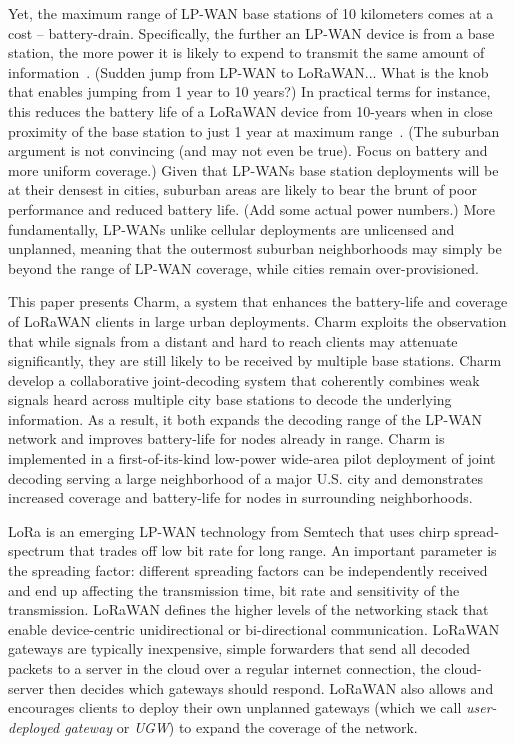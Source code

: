 Yet, the maximum range of LP-WAN base stations of 10 kilometers comes at a
cost -- battery-drain. Specifically, the further an LP-WAN device is from a
base station, the more power it is likely to expend to transmit the same
amount of information{\color{red}~\cite{}}. {\color{blue} (Sudden jump from
LP-WAN to LoRaWAN... What is the knob that enables jumping from 1 year to 10
years?)} In practical terms for instance, this reduces the battery life of a
LoRaWAN device from 10-years when in close proximity of the base station to
just 1 year at maximum range{\color{red}~\cite{}}. {\color{blue} (The suburban
argument is not convincing (and may not even be true). Focus on battery and
more uniform coverage.)} Given that LP-WANs base station deployments will be
at their densest in cities, suburban areas are likely to bear the brunt of
poor performance and reduced battery life. {\color{blue} (Add some actual
power numbers.)} More fundamentally, LP-WANs unlike cellular deployments are
unlicensed and unplanned, meaning that the outermost suburban neighborhoods
may simply be beyond the range of LP-WAN coverage, while cities remain
over-provisioned.


This paper presents Charm, a system that enhances the battery-life and
coverage of LoRaWAN clients in large urban deployments. Charm exploits the
observation that while signals from a distant and hard to reach clients may
attenuate significantly, they are still likely to be received by multiple base
stations. Charm develop a collaborative joint-decoding system that coherently
combines weak signals heard across multiple city base stations to decode the
underlying information. As a result, it both expands the decoding range of the
LP-WAN network and improves battery-life for nodes already in range. Charm is
implemented in a first-of-its-kind low-power wide-area pilot deployment of
joint decoding serving a large neighborhood of a major U.S. city and
demonstrates increased coverage and battery-life for nodes in surrounding
neighborhoods.

LoRa is an emerging LP-WAN technology from Semtech that uses chirp
spread-spectrum that trades off low bit rate for long range. An important
parameter is the spreading factor: different spreading factors can be
independently received and end up affecting the transmission time, bit rate
and sensitivity of the transmission. LoRaWAN defines the higher levels of the
networking stack that enable device-centric unidirectional or bi-directional
communication. LoRaWAN gateways are typically inexpensive, simple forwarders
that send all decoded packets to a server in the cloud over a regular internet
connection, the cloud-server then decides which gateways should respond.
LoRaWAN also allows and encourages clients to deploy their own unplanned
gateways (which we call \textit{user-deployed gateway} or \textit{UGW}) to
expand the coverage of the network.

